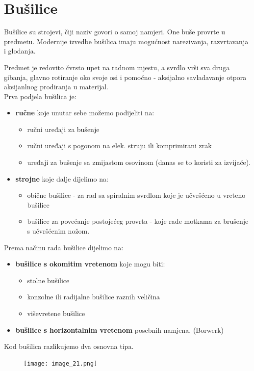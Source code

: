 \documentclass[a4paper,12pt]{article}
\numberwithin{figure}{section}
\begin{document}
\section{Bušilice}
Bušilice su strojevi, čiji naziv govori o samoj namjeri. One buše provrte u predmetu. Modernije izvedbe bušilica imaju mogućnost narezivanja, razvrtavanja i glodanja. \par
Predmet je redovito čvrsto upet na radnom mjestu, a svrdlo vrši sva druga gibanja, glavno rotiranje oko svoje osi i pomoćno - aksijalno savladavanje otpora aksijanlnog prodiranja u materijal. \\
Prva podjela bušilica je:
\begin{itemize}
\item \textbf{ručne} koje unutar sebe možemo podijeliti na:
\begin{itemize}
\item ručni uređaji za bušenje
\item ručni uređaji s pogonom na elek. struju ili komprimirani zrak
\item uređaji za bušenje sa zmijastom osovinom (danas se to koristi za izvijaće).
\end{itemize}
\item \textbf{strojne} koje dalje dijelimo na:
\begin{itemize}
\item obične bušilice - za rad sa spiralnim svrdlom koje je učvršćeno u vreteno bušilice
\item bušilice za povećanje postojećeg provrta - koje rade motkama za brušenje s učvršćenim nožom.
\end{itemize}
\end{itemize} 
Prema načinu rada bušilice dijelimo na:
\begin{itemize}
\item \textbf{bušilice s okomitim vretenom} koje mogu biti:
\begin{itemize}
\item stolne bušilice
\item konzolne ili radijalne bušilice raznih veličina
\item viševretene bušilice
\end{itemize}
\item \textbf{bušilice s horizontalnim vretenom} posebnih namjena. (Borwerk)
\end{itemize}
Kod bušilica razlikujemo dva osnovna tipa.
\begin{figure}[!h]
\centering
\texttt{[image: image\_21.png]}
\end{figure}
\end{document}
